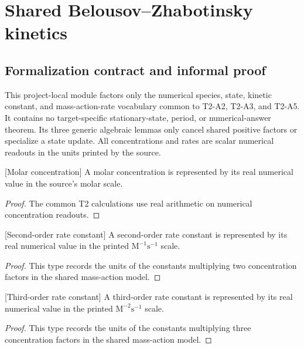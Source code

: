 \section{Shared Belousov--Zhabotinsky kinetics}

\subsection{Formalization contract and informal proof}

This project-local module factors only the numerical species, state, kinetic
constant, and mass-action-rate vocabulary common to T2-A2, T2-A3, and T2-A5.
It contains no target-specific stationary-state, period, or numerical-answer
theorem.  Its three generic algebraic lemmas only cancel shared positive
factors or specialize a state update.  All concentrations and rates are scalar
numerical readouts in the units printed by the source.

\begin{definition}

[Molar concentration]
\label{def:chem:bz:molar_concentration}
A molar concentration is represented by its real numerical value in the
source's molar scale.
\end{definition}
\begin{proof}

The common T2 calculations use real arithmetic on numerical concentration
readouts.
\end{proof}

\begin{definition}

[Second-order rate constant]
\label{def:chem:bz:second_order_rate_constant}
A second-order rate constant is represented by its real numerical value in
the printed $\mathrm{M^{-1}s^{-1}}$ scale.
\end{definition}
\begin{proof}

This type records the units of the constants multiplying two concentration
factors in the shared mass-action model.
\end{proof}

\begin{definition}

[Third-order rate constant]
\label{def:chem:bz:third_order_rate_constant}
A third-order rate constant is represented by its real numerical value in
the printed $\mathrm{M^{-2}s^{-1}}$ scale.
\end{definition}
\begin{proof}

This type records the units of the constants multiplying three concentration
factors in the shared mass-action model.
\end{proof}

